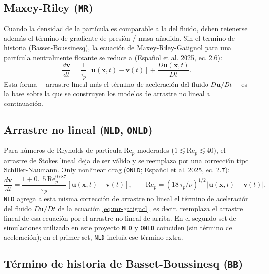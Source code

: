 \documentclass[11pt]{article}
\begin{document}
\subsection{Maxey-Riley (\texttt{MR})}

Cuando la densidad de la partícula es comparable a la del fluido, deben
retenerse además el término de gradiente de presión / masa añadida. Sin el
término de historia (Basset-Boussinesq), la ecuación de
Maxey-Riley-Gatignol para una partícula neutralmente flotante se reduce a
(Español et al. 2025, ec. 2.6):
\begin{equation}
  \frac{d\mathbf{v}}{dt} = \frac{1}{\tau_p}\left[\mathbf{u}(\mathbf{x},t)-\mathbf{v}(t)\right]
  + \frac{D\mathbf{u}(\mathbf{x},t)}{Dt}.
  \label{eq:mr-gatignol}
\end{equation}
Esta forma —arrastre lineal más el término de aceleración del fluido
$D\mathbf{u}/Dt$— es la base sobre la que se construyen los modelos de
arrastre no lineal a continuación.

\subsection{Arrastre no lineal (\texttt{NLD}, \texttt{ONLD})}

Para números de Reynolds de partícula $\mathrm{Re}_p$ moderados
($1 \lesssim \mathrm{Re}_p \lesssim 40$), el arrastre de Stokes lineal deja
de ser válido y se reemplaza por una corrección tipo Schiller-Naumann.
Only nonlinear drag (\texttt{ONLD}; Español et al. 2025, ec. 2.7):
\begin{equation}
  \frac{d\mathbf{v}}{dt} = \frac{1+0.15\,\mathrm{Re}_p^{0.687}}{\tau_p}
  \left[\mathbf{u}(\mathbf{x},t)-\mathbf{v}(t)\right],
  \qquad
  \mathrm{Re}_p = (18\,\tau_p/\nu)^{1/2}\,|\mathbf{u}(\mathbf{x},t)-\mathbf{v}(t)|.
\end{equation}
\texttt{NLD} agrega a esta misma corrección de arrastre no lineal el
término de aceleración del fluido $D\mathbf{u}/Dt$ de la ecuación
\eqref{eq:mr-gatignol}, es decir, reemplaza el arrastre lineal de esa
ecuación por el arrastre no lineal de arriba. En el segundo set de
simulaciones utilizado en este proyecto \texttt{NLD} y \texttt{ONLD}
coinciden (sin término de aceleración); en el primer set, \texttt{NLD}
incluía ese término extra.

\subsection{Término de historia de Basset-Boussinesq (\texttt{BB})}
\end{document}
